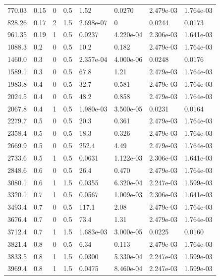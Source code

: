 \documentclass[preview]{standalone}
\begin{document}
{{\begin{tabular}{L{1.2cm}C{1.2cm} C{0.3cm}C{0.5cm} C{1.4cm}C{1.4cm} C{1.4cm}C{1.4cm}}
  770.03  &  0.15  & 0     & 0.5 &  1.52  & 0.0270  & 2.479e-03 &  1.764e-03   \\ 
  828.26  &  0.17  & 2     & 1.5 &  2.698e-07  & 0  & 0.0244 &  0.0173   \\ 
  961.35  &  0.19  & 1     & 0.5 &  0.0237  & 4.220e-04  & 2.306e-03 &  1.641e-03   \\ 
  1088.3  &   0.2  & 0     & 0.5 &  10.2  & 0.182  & 2.479e-03 &  1.764e-03   \\ 
  1460.0  &   0.3  & 0     & 0.5 &  2.357e-04  & 4.000e-06  & 0.0248 &  0.0176   \\ 
  1589.1  &   0.3  & 0     & 0.5 &  67.8  & 1.21  & 2.479e-03 &  1.764e-03   \\ 
  1983.8  &   0.4  & 0     & 0.5 &  32.7  & 0.581  & 2.479e-03 &  1.764e-03   \\ 
  2024.5  &   0.4  & 0     & 0.5 &  48.2  & 0.858  & 2.479e-03 &  1.764e-03   \\ 
  2067.8  &   0.4  & 1     & 0.5 &  1.980e-03  & 3.500e-05  & 0.0231 &  0.0164   \\ 
  2279.7  &   0.5  & 0     & 0.5 &  20.3  & 0.361  & 2.479e-03 &  1.764e-03   \\ 
  2358.4  &   0.5  & 0     & 0.5 &  18.3  & 0.326  & 2.479e-03 &  1.764e-03   \\ 
  2669.9  &   0.5  & 0     & 0.5 &  252.4  & 4.49  & 2.479e-03 &  1.764e-03   \\ 
  2733.6  &   0.5  & 1     & 0.5 &  0.0631  & 1.122e-03  & 2.306e-03 &  1.641e-03   \\ 
  2848.6  &   0.6  & 0     & 0.5 &  26.4  & 0.470  & 2.479e-03 &  1.764e-03   \\ 
  3080.1  &   0.6  & 1     & 1.5 &  0.0355  & 6.320e-04  & 2.247e-03 &  1.599e-03   \\ 
  3320.1  &   0.7  & 1     & 0.5 &  0.0567  & 1.009e-03  & 2.306e-03 &  1.641e-03   \\ 
  3493.4  &   0.7  & 0     & 0.5 &  117.1  & 2.08  & 2.479e-03 &  1.764e-03   \\ 
  3676.4  &   0.7  & 0     & 0.5 &  73.4  & 1.31  & 2.479e-03 &  1.764e-03   \\ 
  3712.4  &   0.7  & 1     & 1.5 &  1.683e-03  & 3.000e-05  & 0.0225 &  0.0160   \\ 
  3821.4  &   0.8  & 0     & 0.5 &  6.34  & 0.113  & 2.479e-03 &  1.764e-03   \\ 
  3833.5  &   0.8  & 1     & 1.5 &  0.0300  & 5.330e-04  & 2.247e-03 &  1.599e-03   \\ 
  3969.4  &   0.8  & 1     & 1.5 &  0.0475  & 8.460e-04  & 2.247e-03 &  1.599e-03   \\ 

\end{tabular}}}
\end{document}
